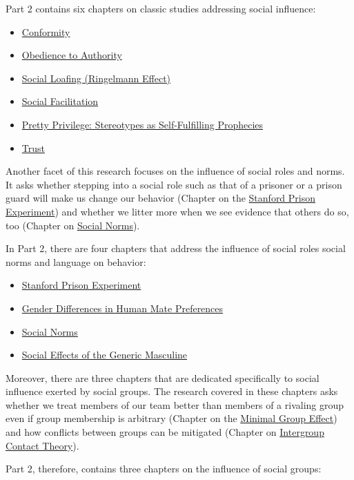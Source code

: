 \documentclass[
  letterpaper,
]{book}
\providecommand{\tightlist}{%
  \setlength{\itemsep}{0pt}\setlength{\parskip}{0pt}}\usepackage{longtable,booktabs,array}
\begin{document}
Part 2 contains six chapters on classic studies addressing social
influence:

\begin{itemize}
\tightlist
\item
  \href{chapter21.qmd}{Conformity}
\item
  \href{chapter4.qmd}{Obedience to Authority}
\item
  \href{chapter7.qmd}{Social Loafing (Ringelmann Effect)}
\item
  \href{chapter8.qmd}{Social Facilitation}
\item
  \href{chapter1.qmd}{Pretty Privilege: Stereotypes as Self-Fulfilling
  Prophecies}
\item
  \href{chapter24.qmd}{Trust}
\end{itemize}

Another facet of this research focuses on the influence of social roles
and norms. It asks whether stepping into a social role such as that of a
prisoner or a prison guard will make us change our behavior (Chapter on
the \href{chapter10.qmd}{Stanford Prison Experiment}) and whether we
litter more when we see evidence that others do so, too (Chapter on
\href{chapter22.qmd}{Social Norms}).

In Part 2, there are four chapters that address the influence of social
roles social norms and language on behavior:

\begin{itemize}
\tightlist
\item
  \href{chapter10.qmd}{Stanford Prison Experiment}
\item
  \href{chapter26.qmd}{Gender Differences in Human Mate Preferences}
\item
  \href{chapter22.qmd}{Social Norms}
\item
  \href{chapter23.qmd}{Social Effects of the Generic Masculine}
\end{itemize}

Moreover, there are three chapters that are dedicated specifically to
social influence exerted by social groups. The research covered in these
chapters asks whether we treat members of our team better than members
of a rivaling group even if group membership is arbitrary (Chapter on
the \href{chapter9.qmd}{Minimal Group Effect}) and how conflicts between
groups can be mitigated (Chapter on \href{chapter12.qmd}{Intergroup
Contact Theory}).

Part 2, therefore, contains three chapters on the influence of social
groups:
\end{document}
